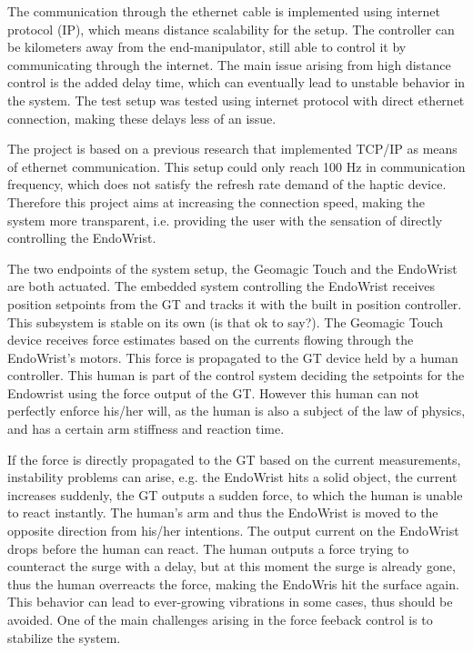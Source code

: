 The communication through the ethernet cable is implemented using internet protocol (IP), which means distance scalability for the setup. The controller can be kilometers away from the end-manipulator, still able to control it by communicating through the internet. The main issue arising from high distance control is the added delay time, which can eventually lead to unstable behavior in the system. The test setup was tested using internet protocol with direct ethernet connection, making these delays less of an issue.

The project is based on a previous research that implemented TCP/IP as means of ethernet communication. This setup could only reach 100 Hz in communication frequency, which does not satisfy the refresh rate demand of the haptic device. Therefore this project aims at increasing the connection speed, making the system more transparent, i.e. providing the user with the sensation of directly controlling the EndoWrist.

The two endpoints of the system setup, the Geomagic Touch and the EndoWrist are both actuated. The embedded system controlling the EndoWrist receives position setpoints from the GT and tracks it with the built in position controller. This subsystem is stable on its own (is that ok to say?). The Geomagic Touch device receives force estimates based on the currents flowing through the EndoWrist's motors. This force is propagated to the GT device held by a human controller. This human is part of the control system deciding the setpoints for the Endowrist using the force output of the GT. However this human can not perfectly enforce his/her will, as the human is also a subject of the law of physics, and has a certain arm stiffness and reaction time.

If the force is directly propagated to the GT based on the current measurements, instability problems can arise, e.g. the EndoWrist hits a solid object, the current increases suddenly, the GT outputs a sudden force, to which the human is unable to react instantly. The human's arm and thus the EndoWrist is moved to the opposite direction from his/her intentions. The output current on the EndoWrist drops before the human can react. The human outputs a force trying to counteract the surge with a delay, but at this moment the surge is already gone, thus the human overreacts the force, making the EndoWris hit the surface again. This behavior can lead to ever-growing vibrations in some cases, thus should be avoided. One of the main challenges arising in the force feeback control is to stabilize the system.


%